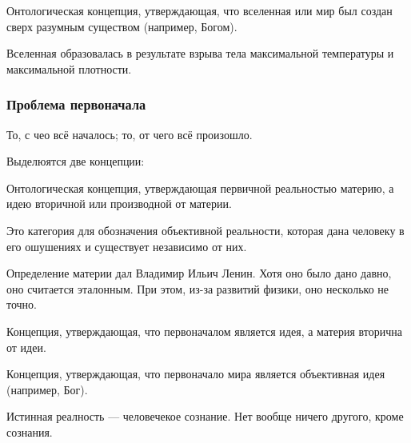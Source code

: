 \begin{definition}[Креационизм]
	Онтологическая концепция, утверждающая, что вселенная или мир был создан
	сверх разумным существом (например, Богом).
\end{definition}

\begin{definition}
	Вселенная образовалась в результате взрыва тела максимальной температуры и
	максимальной плотности.
\end{definition}

\subsubsection{Проблема первоначала}

\begin{definition}[Первоначало]
	То, с чео всё началось; то, от чего всё произошло.
\end{definition}

Выделюятся две концепции:

\hrulefill

\begin{definition}[Материализм]
	Онтологическая концепция, утверждающая первичной реальностью материю, а идею
	вторичной или производной от материи.
\end{definition}

\begin{definition}[Материя]
	Это категория для обозначения объективной реальности, которая дана человеку в
	его ошушениях и существует независимо от них.

	Определение материи дал Владимир Ильич Ленин. Хотя оно было дано
	давно, оно считается эталонным. При этом, из-за развитий физики,
	оно несколько не точно.
\end{definition}

\hrulefill

\begin{definition}[Идеализм]
	Концепция, утверждающая, что первоначалом является идея, а материя вторична от
	идеи.
\end{definition}

\begin{definition}
	Концепция, утверждающая, что первоначало мира является объективная идея
	(например, Бог).
\end{definition}

\begin{definition}
	Истинная реалность --- человечекое сознание. Нет вообще ничего другого, кроме
	сознания.
\end{definition}

